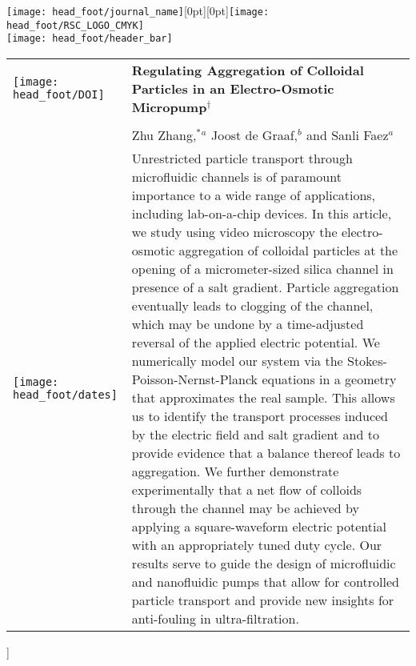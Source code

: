 \documentclass[twoside,twocolumn,9pt]{article}
\begin{document}
  \begin{@twocolumnfalse}
{\texttt{[image: head\_foot/journal\_name]}\hfill\raisebox{0pt}[0pt][0pt]{\texttt{[image: head\_foot/RSC\_LOGO\_CMYK]}}\\[1ex]
\texttt{[image: head\_foot/header\_bar]}}\par
\vspace{1em}
\sffamily
\begin{tabular}{m{4.5cm} p{13.5cm} }

\texttt{[image: head\_foot/DOI]} & \noindent\LARGE{\textbf{Regulating Aggregation of Colloidal Particles in an Electro-Osmotic Micropump$^\dag$}} \\
\vspace{0.3cm} & \vspace{0.3cm} \\

 & \noindent\large{Zhu Zhang,$^{\ast}$\textit{$^{a}$} Joost de Graaf,\textit{$^{b}$} and Sanli Faez\textit{$^{a}$}} \\

\texttt{[image: head\_foot/dates]} & \noindent\normalsize{Unrestricted particle transport through microfluidic channels is of paramount importance to a wide range of applications, including lab-on-a-chip devices. 
In this article, we study using video microscopy the electro-osmotic aggregation of colloidal particles at the opening of a micrometer-sized silica channel in presence of a salt gradient. 
Particle aggregation eventually leads to clogging of the channel, which may be undone by a time-adjusted reversal of the applied electric potential.
We numerically model our system via the Stokes-Poisson-Nernst-Planck equations in a geometry that approximates the real sample. 
This allows us to identify the transport processes induced by the electric field and salt gradient and to provide evidence that a balance thereof leads to aggregation. 
We further demonstrate experimentally that a net flow of colloids through the channel may be achieved by applying a square-waveform electric potential with an appropriately tuned duty cycle. 
Our results serve to guide the design of microfluidic and nanofluidic pumps that allow for controlled particle transport and provide new insights for anti-fouling in ultra-filtration.} 

\\%

\end{tabular}

 \end{@twocolumnfalse} \vspace{0.6cm}
]
\end{document}

